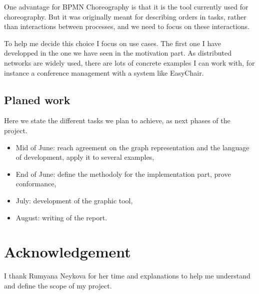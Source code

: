 \documentclass{article}
\begin{document}
One advantage for BPMN Choreography is that it is the tool currently used for choreography. But it was originally meant for describing orders in tasks, rather than interactions between processes, and we need to focus on these interactions.

To help me decide this choice I focus on use cases. The first one I have developped in the one we have seen in the motivation part. As distributed networks are widely used, there are lots of concrete examples I can work with, for instance a conference management with a system like EasyChair.

\subsection{Planed work}

Here we state the different tasks we plan to achieve, as next phases of the project.
\begin{itemize}
\item Mid of June: reach agreement on the graph representation and the language of development, apply it to several examples,
\item End of June: define the methodoly for the implementation part, prove conformance,
\item July: development of the graphic tool,
\item August: writing of the report.
\end{itemize}


\section*{Acknowledgement}
I thank Rumyana Neykova for her time and explanations to help me understand and define the scope of my project.




\end{document}
